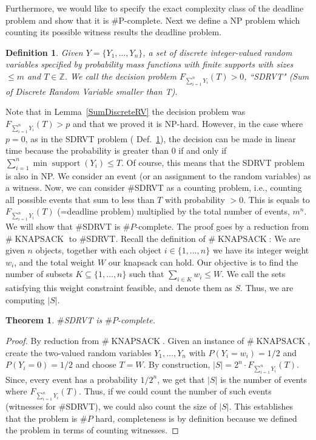\documentclass{article}
\newtheorem{theorem}{Theorem}
\newtheorem{definition}{Definition}
\DeclareMathOperator{\support}{support}
\begin{document}
Furthermore, we would like to specify the exact complexity class of the deadline problem and show that it is $\#$P-complete. Next we define a NP problem which counting its possible witness results the deadline problem. 
\begin{definition}\label{Def:SDRVT}
Given $Y=\{Y_1,\dots,Y_n\}$, a set of discrete integer-valued random variables specified by probability mass functions with finite supports with sizes $\leq m$ and $T \in \mathbb{Z}$. We call the decision problem $F_{\sum_{i=1}^{n} Y_{i}} (T)>0$, ``SDRVT" (Sum of Discrete Random Variable smaller than T).
\end{definition}
Note that in Lemma~\ref{SumDiscreteRV} the decision problem was $F_{\sum_{i=1}^{n} Y_{i}}(T)>p$ and that we proved it is NP-hard.
However, in the case where $p=0$, as in the SDRVT problem ( Def.~\ref{Def:SDRVT}), the decision  can be made in linear time because the probability is greater than $0$ if and only if $\sum_{i=1}^{n} \min{\support(Y_{i})} \leq T$. Of course, this means that the SDRVT problem is also in NP. We consider an event (or an assignment to the random variables) as a witness. Now, we can consider $\#$SDRVT as a counting problem, i.e., counting all possible events that sum to less than $T$ with probability $>0$. 
This is equals to $F_{\sum_{i=1}^{n} Y_{i}}(T)$ (=deadline problem) multiplied by the total number of events, $m^n$. We will show that $\#$SDRVT is $\#P$-complete. The proof goes by a reduction from $\#\operatorname{KNAPSACK}$ to $\#$SDRVT. Recall the definition of $\#\operatorname{KNAPSACK}$\cite{arora2009computational}: We are given $n$ objects, together with each object $i\in \{1,\dots , n\}$ we have its integer weight $w_i$, and the total weight $W$ our knapsack can hold. Our objective is to find the number of subsets $K \subseteq \{1, \dots , n\}$ such that $\sum_{i \in K} w_i \leq W$. We call the sets satisfying this weight constraint feasible, and denote them as $S$. Thus, we are computing $|S|$.

\begin{theorem} \label{deadlinSP}
$\#$SDRVT is $\#P$-complete.
\end{theorem}

\begin{proof} By reduction from $\#\operatorname{KNAPSACK}
$. Given an instance of $\#\operatorname{KNAPSACK}
$, create the two-valued random variables $Y_{1},\dots,Y_{n} $ with $P(Y_i=w_i)=1/2$ and $P(Y_i=0)=1/2$ and choose $T=W$. By construction, $|S|=2^n \cdot F_{\sum_{i=1}^{n} Y_{i}}(T)$. Since, every event has a probability $1/2^n$, we get that $|S|$ is the number of events where $F_{\sum_{i=1}^{n} Y_{i}}(T)$. Thus, if we could count the number of such events (witnesses for $\#$SDRVT), we could also count the size of $|S|$. This establishes that the problem is $\#P$ hard, completeness is by definition because we defined the problem in terms of counting witnesses.
\end{proof}
\end{document}
